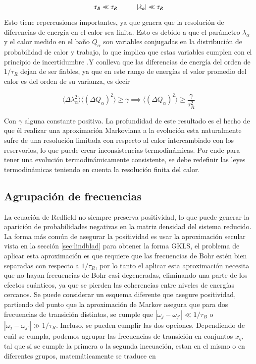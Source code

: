 \begin{equation*}
    \tau_{B} \ll \tau_{R} \hspace{10mm} |\lambda_{\alpha}| \ll \tau_{R}
\end{equation*}

Esto tiene repercusiones importantes, ya que genera que la resolución de diferencias de energía en el calor sea finita. Esto es debido a que el parámetro $\lambda_{\alpha}$ y el calor medido en el baño $Q_{\alpha}$ son variables conjugadas en la distribución de probabilidad de calor y trabajo, lo que implica que estas variables cumplen con el principio de incertidumbre \cite{folland1997uncertainty}.Y conlleva que las diferencias de energía del orden de $1/\tau_{R}$ dejan de ser fiables, ya que en este rango de energías el valor promedio del calor es del orden de su varianza, es decir

\begin{equation*}
    \langle \Delta \lambda^{2}_{\alpha} \rangle \langle (\Delta Q_{\alpha})^{2}\rangle \geq \gamma \implies \langle (\Delta Q_{\alpha})^{2}\rangle  \geq \frac{\gamma}{\tau^{2}_{R}}
\end{equation*}

Con $\gamma$ alguna constante positiva. La profundidad de este resultado es el hecho de que él realizar una aproximación Markoviana a la evolución esta naturalmente sufre de una resolución limitada con respecto al calor intercambiado con los reservorios, lo que puede crear inconsistencias termodinámicas. Por ende para tener una evolución termodinámicamente consistente, se debe redefinir las leyes termodinámicas teniendo en cuenta la resolución finita del calor.

\label{sec2:finiteresol}

\subsection{Agrupación de frecuencias}
La ecuación de Redfield no siempre preserva positividad, lo que puede generar la aparición de probabilidades negativas en la matriz densidad del sistema reducido. La forma más común de asegurar la positividad es usar la aproximación secular vista en la sección \ref{sec:lindblad} para obtener la forma GKLS, el problema de aplicar esta aproximación es que requiere que las frecuencias de Bohr estén bien separadas con respecto a $1/\tau_{R}$, por lo tanto el aplicar esta aproximación necesita que no hayan frecuencias de Bohr casi degeneradas, eliminando una parte de los efectos cuánticos, ya que se pierden las coherencias entre niveles de energías cercanos\cite{trushechkin2021unified}. Se puede considerar un esquema diferente que asegure positividad, partiendo del punto que la aproximación de Markov asegura que para dos frecuencias de transición distintas, se cumple que $|\omega_{j} - \omega_{j'}|\ll 1/\tau_{B}$ o $|\omega_{j}-\omega_{j'}|\gg 1/\tau_{R}$. Incluso, se pueden cumplir las dos opciones. Dependiendo de cuál se cumpla, podemos agrupar las frecuencias de transición en conjuntos $x_{q}$, tal que si se cumple la primera o la segunda inecuación, estan en el mismo o en diferentes grupos, matemáticamente se traduce en

